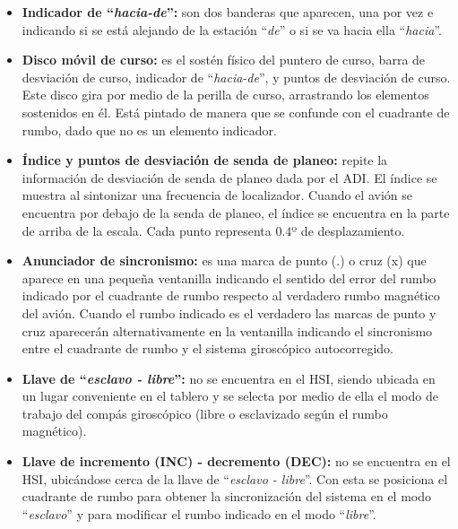 \begin{itemize}
      \item {\bf Indicador de ``\emph{hacia-de}'': }
	son dos banderas que aparecen, una por vez e indicando si se est\'a alejando
	de la estaci\'on ``\emph{de}'' o si se va hacia ella ``\emph{hacia}''.

      \item {\bf Disco m\'ovil de curso: }
	es el sost\'en f\'isico del puntero de curso, barra de desviaci\'on de curso,
	indicador de ``\emph{hacia-de}'', y puntos de desviaci\'on de curso.
	Este disco gira por medio de la perilla de curso, arrastrando los elementos
	sostenidos en \'el. Est\'a pintado de manera que se confunde con el
	cuadrante de rumbo, dado que no es un elemento indicador.

      \item {\bf \'Indice y puntos de desviaci\'on de senda de planeo: }
	repite la informaci\'on de desviaci\'on de senda de planeo dada por el ADI.
	El \'indice se muestra al sintonizar una frecuencia de localizador.
	Cuando el avi\'on se encuentra por debajo de la senda de planeo, 
	el \'indice se encuentra en la parte de arriba de la escala.
	Cada punto representa $0.4$º de desplazamiento.

      \item {\bf Anunciador de sincronismo:}
	es una marca de punto (.) o cruz (x) que aparece en una peque\~na ventanilla
	indicando el sentido del error del rumbo indicado por el cuadrante de
	rumbo respecto al verdadero rumbo magn\'etico del avi\'on.
	Cuando el rumbo indicado es el verdadero las marcas de punto y cruz
	aparecer\'an alternativamente en la ventanilla indicando el sincronismo
	entre el cuadrante de rumbo y el sistema girosc\'opico autocorregido.

      \item {\bf Llave de ``\emph{esclavo - libre}'': }
	no se encuentra en el HSI, siendo ubicada en un lugar conveniente en el tablero
	y se selecta por medio de ella el modo de trabajo del comp\'as 
	girosc\'opico (libre o esclavizado seg\'un el rumbo magn\'etico).

      \item {\bf Llave de incremento (INC) - decremento (DEC): }
	no se encuentra 
	en el HSI, ubic\'andose cerca de la llave de   ``\emph{esclavo - libre}''.
	Con esta se posiciona el cuadrante de rumbo para obtener la
	sincronizaci\'on del sistema en el modo ``\emph{esclavo}'' y para
	modificar el rumbo indicado en el modo ``\emph{libre}''.

\end{itemize}

